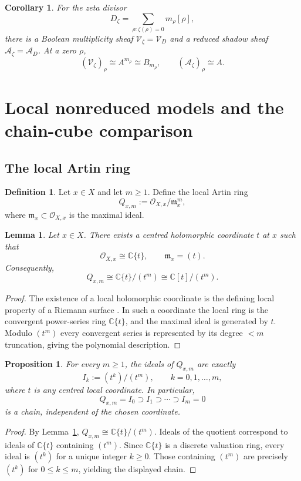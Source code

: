 \documentclass[11pt,a4paper]{article}
\newtheorem{proposition}[theorem]{Proposition}
\newtheorem{lemma}[theorem]{Lemma}
\newtheorem{corollary}[theorem]{Corollary}
\theoremstyle{definition}
\newtheorem{definition}[theorem]{Definition}
\theoremstyle{remark}
\newcommand{\CC}{\mathbb C}
\newcommand{\cO}{\mathcal O}
\newcommand{\Vd}{\mathcal V_D}
\newcommand{\Ad}{\mathcal A_D}
\newcommand{\Vz}{\mathcal V_\zeta}
\newcommand{\Az}{\mathcal A_\zeta}
\begin{document}
\begin{corollary}\label{cor:shadow-stalks}
For the zeta divisor
\[
D_\zeta=\sum_{\rho: \zeta(\rho)=0}m_\rho[\rho],
\]
there is a Boolean multiplicity sheaf $\Vz=\Vd$ and a reduced shadow sheaf $\Az=\Ad$. At a zero $\rho$,
\[
(\Vz)_\rho\cong A^{m_\rho}\cong B_{m_\rho},
\qquad
(\Az)_\rho\cong A.
\]
\end{corollary}

\section{Local nonreduced models and the chain-cube comparison}

\subsection{The local Artin ring}

\begin{definition}
Let $x\in X$ and let $m\geq 1$. Define the local Artin ring
\[
Q_{x,m}:=\cO_{X,x}/\mathfrak m_x^m,
\]
where $\mathfrak m_x\subset \cO_{X,x}$ is the maximal ideal.
\end{definition}

\begin{lemma}\label{lem:dvr-local}
Let $x\in X$. There exists a centred holomorphic coordinate $t$ at $x$ such that
\[
\cO_{X,x}\cong \CC\{t\},\qquad \mathfrak m_x=(t).
\]
Consequently,
\[
Q_{x,m}\cong \CC\{t\}/(t^m)\cong \CC[t]/(t^m).
\]
\end{lemma}

\begin{proof}
The existence of a local holomorphic coordinate is the defining local property of a Riemann surface \cite[Chapter~1]{Lee}. In such a coordinate the local ring is the convergent power-series ring $\CC\{t\}$, and the maximal ideal is generated by $t$. Modulo $(t^m)$ every convergent series is represented by its degree $<m$ truncation, giving the polynomial description.
\end{proof}

\begin{proposition}\label{prop:ideal-chain-local}
For every $m\geq 1$, the ideals of $Q_{x,m}$ are exactly
\[
I_k:=(t^k)/(t^m),\qquad k=0,1,\dots,m,
\]
where $t$ is any centred local coordinate. In particular,
\[
Q_{x,m}=I_0\supset I_1\supset\cdots\supset I_m=0
\]
is a chain, independent of the chosen coordinate.
\end{proposition}

\begin{proof}
By Lemma~\ref{lem:dvr-local}, $Q_{x,m}\cong \CC\{t\}/(t^m)$. Ideals of the quotient correspond to ideals of $\CC\{t\}$ containing $(t^m)$. Since $\CC\{t\}$ is a discrete valuation ring, every ideal is $(t^k)$ for a unique integer $k\geq 0$. Those containing $(t^m)$ are precisely $(t^k)$ for $0\leq k\leq m$, yielding the displayed chain.
\end{proof}
\end{document}
